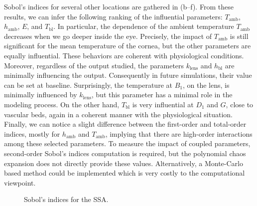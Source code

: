 Sobol's indices for several other locations are gathered in (b--f).
From these results, we can infer the following ranking of the influential parameters: $T_\text{amb}$, $h_\text{amb}$, $E$, and $T_\text{bl}$.
In particular, the dependence of the ambient temperature $T_\text{amb}$ decreases when we go deeper inside the eye.
Precisely, the impact of $T_\text{amb}$ is still significant for the mean temperature of the cornea, but the other parameters are equally influential.
These behaviors are coherent with physiological conditions.
Moreover, regardless of the output studied, the parameters $k_\text{lens}$ and $h_\text{bl}$ are minimally influencing the output.
Consequently in future simulations, their value can be set at baseline.
Surprisingly, the temperature at $B_1$, on the lens, is minimally influenced by $k_\text{lens}$, but this parameter has a minimal role in the modeling process.
On the other hand, $T_\text{bl}$ is very influential at $D_1$ and $G$, close to vascular beds,
again in a coherent manner with the physiological situation.
Finally, we can notice a slight difference between the first-order and total-order indices, mostly for $h_\text{amb}$ and $T_\text{amb}$,
implying that there are high-order interactions among these selected parameters.
To measure the impact of coupled parameters, second-order Sobol's indices computation is required, but the polynomial chaos expansion does not directly provide these values.
Alternatively, a Monte-Carlo based method could be implemented which is very costly to the computational viewpoint.



\begin{figure}
    \centering
    \def\mymarker{x}
    \def\chl{0.96}
    \caption{Sobol's indices for the SSA.}
    \label{fig:results:SSA:sobol}
\end{figure}